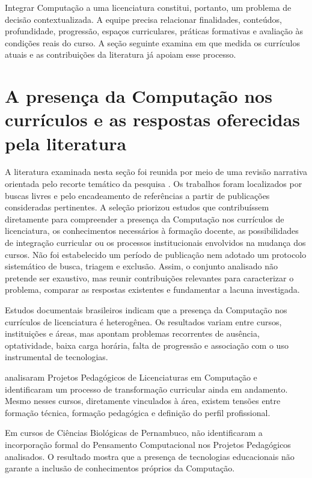 Integrar Computação a uma licenciatura constitui, portanto, um problema de decisão contextualizada. A equipe precisa relacionar finalidades, conteúdos, profundidade, progressão, espaços curriculares, práticas formativas e avaliação às condições reais do curso. A seção seguinte examina em que medida os currículos atuais e as contribuições da literatura já apoiam esse processo.

\section{A presença da Computação nos currículos e as respostas oferecidas pela literatura}
\label{sec:situacao-solucoes}

A literatura examinada nesta seção foi reunida por meio de uma revisão narrativa orientada pelo recorte temático da pesquisa \cite{Ogassavara2025}. Os trabalhos foram localizados por buscas livres e pelo encadeamento de referências a partir de publicações consideradas pertinentes. A seleção priorizou estudos que contribuíssem diretamente para compreender a presença da Computação nos currículos de licenciatura, os conhecimentos necessários à formação docente, as possibilidades de integração curricular ou os processos institucionais envolvidos na mudança dos cursos. Não foi estabelecido um período de publicação nem adotado um protocolo sistemático de busca, triagem e exclusão. Assim, o conjunto analisado não pretende ser exaustivo, mas reunir contribuições relevantes para caracterizar o problema, comparar as respostas existentes e fundamentar a lacuna investigada.

Estudos documentais brasileiros indicam que a presença da Computação nos currículos de licenciatura é heterogênea. Os resultados variam entre cursos, instituições e áreas, mas apontam problemas recorrentes de ausência, optatividade, baixa carga horária, falta de progressão e associação com o uso instrumental de tecnologias.

 analisaram Projetos Pedagógicos de Licenciaturas em Computação e identificaram um processo de transformação curricular ainda em andamento. Mesmo nesses cursos, diretamente vinculados à área, existem tensões entre formação técnica, formação pedagógica e definição do perfil profissional.

Em cursos de Ciências Biológicas de Pernambuco,  não identificaram a incorporação formal do Pensamento Computacional nos Projetos Pedagógicos analisados. O resultado mostra que a presença de tecnologias educacionais não garante a inclusão de conhecimentos próprios da Computação.

